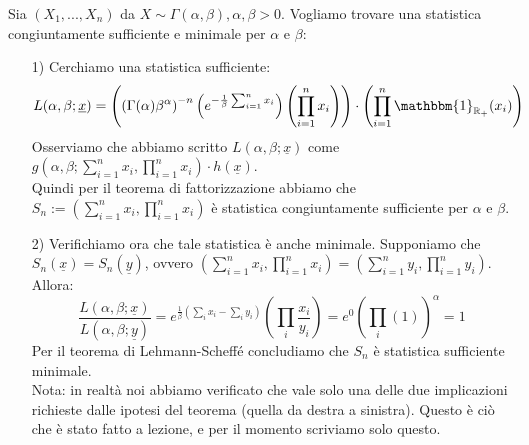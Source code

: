 \begin{esempio} Sia $(X_1,...,X_n)$ da $X \sim \Gamma(\alpha,\beta), \alpha, \beta >0$. Vogliamo trovare una statistica congiuntamente sufficiente e minimale per $\alpha$ e $\beta$:
\begin{enumerate}
\item [1)] Cerchiamo una statistica sufficiente:
$$L(\alpha,\beta;\underline{x}) = \left( \left( \Gamma(\alpha)\beta^{\alpha}\right)^{-n} \left( e^{-\frac{1}{\beta} \sum_{i=1}^n x_i} \right) \left( \prod_{i=1}^n x_i \right) \right) \cdot \left( \prod_{i=1}^n \mathbbm{1}_{\mathbb{R_+}}(x_i) \right)$$
Osserviamo che abbiamo scritto $L(\alpha,\beta;\underline{x})$ come $g \left( \alpha,\beta; \sum_{i=1}^n x_i, \prod_{i=1}^n x_i \right) \cdot h(\underline{x})$.\\
Quindi per il teorema di fattorizzazione abbiamo che $S_n:=\left( \sum_{i=1}^n x_i, \prod_{i=1}^n x_i \right)$ è statistica congiuntamente sufficiente per $\alpha$ e $\beta$.
\item [2)] Verifichiamo ora che tale statistica è anche minimale. Supponiamo che $S_n(\underline{x})=S_n(\underline{y})$, ovvero $\left( \sum_{i=1}^n x_i, \prod_{i=1}^n x_i \right) = \left( \sum_{i=1}^n y_i, \prod_{i=1}^n y_i \right)$. Allora:
$$\frac{L(\alpha,\beta;\underline{x})}{L(\alpha,\beta;\underline{y})} = e^{\frac{1}{\beta} \left( \sum_i x_i - \sum_i y_i \right)} \left( \prod_i \frac{x_i}{y_i} \right) = e^{0} \left( \prod_i (1) \right)^{\alpha} = 1$$
Per il teorema di Lehmann-Scheffé concludiamo che $S_n$ è statistica sufficiente minimale.\\
Nota: in realtà noi abbiamo verificato che vale solo una delle due implicazioni richieste dalle ipotesi del teorema (quella da destra a sinistra). Questo è ciò che è stato fatto a lezione, e per il momento scriviamo solo questo.
\end{enumerate}
\end{esempio}